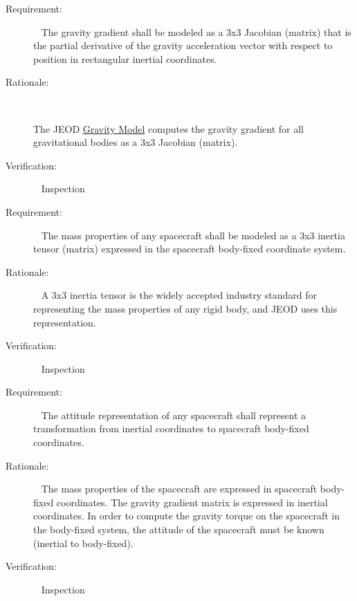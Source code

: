 \label{reqt:gradient_matrix}
\begin{description}
\item[Requirement:]\ \newline
The gravity gradient shall be modeled as a 3x3 Jacobian (matrix) that is
the partial derivative of the gravity acceleration vector with respect to
position in rectangular inertial coordinates. 
\item[Rationale:]\ \newline



The JEOD
\hyperref{file:\JEODHOME/models/environment/gravity/docs/gravity.pdf}{}{}
{Gravity Model} computes the gravity gradient for all 
gravitational bodies as a 3x3 Jacobian (matrix).  
\item[Verification:]\ \newline
Inspection
\end{description}

\label{reqt:mass_properties}
\begin{description}
\item[Requirement:]\ \newline
The mass properties of any spacecraft shall be modeled as a 3x3 inertia
tensor (matrix) expressed in the spacecraft body-fixed coordinate system.
\item[Rationale:]\ \newline
A 3x3 inertia tensor is the widely accepted industry standard for 
representing the mass properties of any rigid body, and JEOD uses
this representation.
\item[Verification:]\ \newline
Inspection
\end{description}

\label{reqt:spacecraft_attitude}
\begin{description}
\item[Requirement:]\ \newline
The attitude representation of any spacecraft shall 
represent a transformation from inertial coordinates
to spacecraft body-fixed coordinates.
\item[Rationale:]\ \newline
The mass properties of the spacecraft are expressed in spacecraft 
body-fixed coordinates. The gravity gradient matrix is expressed in
inertial coordinates.  In order to compute the gravity 
torque on the spacecraft in the body-fixed system, the attitude of the spacecraft must be
known (inertial to body-fixed).
\item[Verification:]\ \newline
Inspection
\end{description}


